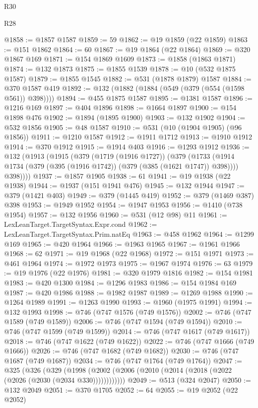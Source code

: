 \begin{lexlean}{R30}
\begin{lexlean}{R28}
\begin{coremodule}
{{{{{{{{{{{{{{{{{{{{{{{{{{{{{{{{{{{{{{{{{{{{{{{{{{{{{{{{{{{{{{{{{{{{{{{{{{{{{{{{{{{{{{{{{{{{{{{{{{{{{{{{{{{{{{{{{{{{{{{{{{{{{{{{{{{{{{{{{{{{{{{@1858 := @1857 @1587
@1859 := 59
@1862 := @19 @1859 (@22 @1859)
@1863 := @151 @1862
@1864 := 60
@1867 := @19 @1864 (@22 @1864)
@1869 := @320 @1867 @169
@1871 := @154 @1869 @1609
@1873 := @1858 (@1863 @1871)
@1874 := @132 @1873
@1875 := @1855 @1539
@1878 := @10 (@532 @1875 @1587)
@1879 := @1855 @1545
@1882 := @531 (@1878 @1879) @1587
@1884 := @370 @1587 @419
@1892 := @132 (@1882 (@1884 (@549 (@379 (@554 (@1598 @561)) @398))))
@1894 := @455 @1875 @1587
@1895 := @1381 @1587
@1896 := @1216 @169
@1897 := @404 @1896
@1898 := @1664 @1897
@1900 := @154 @1898 @476
@1902 := @1894 (@1895 @1900)
@1903 := @132 @1902
@1904 := @532 @1856
@1905 := @48 @1587
@1910 := @531 (@10 (@1904 @1905) (@96 @1856))
@1911 := @1210 @1587
@1912 := @1911 @1712
@1913 := @1910 @1912
@1914 := @370 @1912
@1915 := @1914 @403
@1916 := @1293 @1912
@1936 := @132
    (@1913
      (@1915
        (@379
          (@1719 (@1916 @1727))
          (@379
            (@1733 (@1914 @1734 (@379 (@395 (@1916 @1742)) (@379 (@385 (@1621 @1747)) @398))))
            @398))))
@1937 := @1857 @1905
@1938 := 61
@1941 := @19 @1938 (@22 @1938)
@1944 := @1937 (@151 @1941 @476)
@1945 := @132 @1944
@1947 := @379 (@1421 @403)
@1949 := @379 (@1445 @419)
@1952 := @379 (@1469 @387) @398
@1953 := @1949 @1952
@1954 := @1947 @1953
@1956 := @1410 (@738 @1954)
@1957 := @132 @1956
@1960 := @531 (@12 @98) @11
@1961 := LexLeanTarget.TargetSyntax.Expr.cond
@1962 := LexLeanTarget.TargetSyntax.Prim.natEq
@1963 := @458 @1962
@1964 := @1299 @169
@1965 := @420 @1964
@1966 := @1963 @1965
@1967 := @1961 @1966
@1968 := 62
@1971 := @19 @1968 (@22 @1968)
@1972 := @151 @1971
@1973 := @461 @1964
@1974 := @1972 @1973
@1975 := @1967 @1974
@1976 := 63
@1979 := @19 @1976 (@22 @1976)
@1981 := @320 @1979 @1816
@1982 := @154 @1981
@1983 := @420 @1300
@1984 := @1296 @1983
@1986 := @154 @1984 @169
@1987 := @420 @1986
@1988 := @1982 @1987
@1989 := @1269 @1988
@1990 := @1264 @1989
@1991 := @1263 @1990
@1993 := @1960 (@1975 @1991)
@1994 := @132 @1993
@1998 := @746 (@747 @1576 (@749 @1576))
@2002 := @746 (@747 @1589 (@749 @1589))
@2006 := @746 (@747 @1594 (@749 @1594))
@2010 := @746 (@747 @1599 (@749 @1599))
@2014 := @746 (@747 @1617 (@749 @1617))
@2018 := @746 (@747 @1622 (@749 @1622))
@2022 := @746 (@747 @1666 (@749 @1666))
@2026 := @746 (@747 @1682 (@749 @1682))
@2030 := @746 (@747 @1687 (@749 @1687))
@2034 := @746 (@747 @1764 (@749 @1764))
@2047 := @325
    (@326
      (@329 (@1998 (@2002 (@2006 (@2010 (@2014 (@2018 (@2022 (@2026 (@2030 (@2034 @330))))))))))))
@2049 := @513 (@324 @2047)
@2050 := @132 @2049
@2051 := @370 @1705
@2052 := 64
@2055 := @19 @2052 (@22 @2052)
}}}}}}}}}}}}}}}}}}}}}}}}}}}}}}}}}}}}}}}}}}}}}}}}}}}}}}}}}}}}}}}}}}}}}}}}}}}}}}}}}}}}}}}}}}}}}}}}}}}}}}}}}}}}}}}}}}}}}}}}}}}}}}}}}}}}}}}}}}}}}}}
\end{coremodule}
\end{lexlean}
\end{lexlean}
